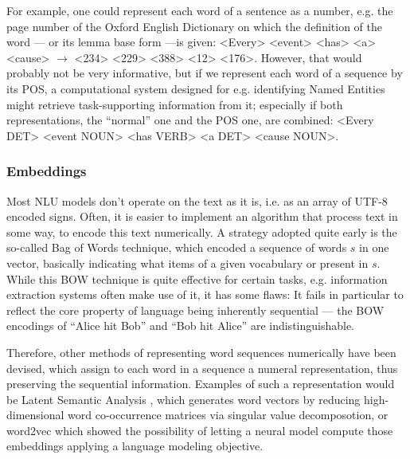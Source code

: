 For example, one could represent each word of a sentence as a number, e.g. the page number of the
Oxford English Dictionary on which the definition of the word --- or its lemma base form ---is
given: <Every> <event> <has> <a> <cause> $\rightarrow$ <234> <229> <388> <12> <176>. However, that
would probably not be very informative, but if we represent each word of a sequence by its POS, a
computational system designed for e.g. identifying Named Entities might retrieve task-supporting
information from it; especially if both representations, the ``normal'' one and the POS one, are
combined: <Every DET> <event NOUN> <has VERB> <a DET> <cause NOUN>.


\subsubsection*{Embeddings}


Most NLU models don't operate on the text as it is, i.e. as an array of UTF-8 encoded
signs. Often, it is easier to implement an algorithm that process text in some way, to
encode this text numerically. A strategy adopted quite early is the so-called Bag of
Words \citep{harris1954distributional} technique, which encoded a sequence of words $s$
in one vector, basically indicating what items of a given vocabulary or present in $s$.
While this BOW technique is quite effective for certain tasks, e.g. information extraction
systems often make use of it, it has some flaws: It fails in particular to reflect the core
property of language being inherently sequential --- the BOW encodings of ``Alice hit Bob''
and ``Bob hit Alice'' are indistinguishable.

Therefore, other methods of representing word sequences numerically have been devised, which assign
to each word in a sequence a numeral representation, thus preserving the sequential information.
Examples of such a representation would be Latent Semantic Analysis \citep{furnas1988using}, which
generates word vectors by reducing high-dimensional word co-occurrence matrices via singular value
decomposotion, or word2vec \citep{mikolov2013distributed} which showed the possibility of letting a
neural model compute those embeddings applying a language modeling objective.



